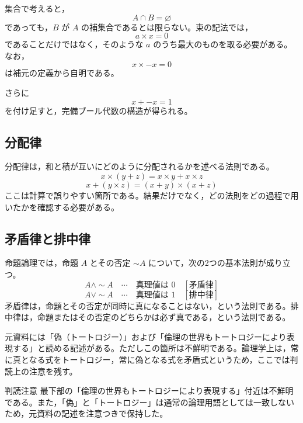 \documentclass[../main.tex]{subfiles}
\begin{document}
\begin{center}
\end{center}

集合で考えると，
\[
  A \cap B = \varnothing
\]
であっても，\(B\) が \(A\) の補集合であるとは限らない。束の記法では，
\[
  a \times x = 0
\]
であることだけではなく，そのような \(a\) のうち最大のものを取る必要がある。なお，
\[
  x \times -x = 0
\]
は補元の定義から自明である。

さらに
\[
  x + -x = 1
\]
を付け足すと，完備ブール代数の構造が得られる。

\subsection{分配律}

分配律は，和と積が互いにどのように分配されるかを述べる法則である。
\[
  x \times (y+z)
  =
  x \times y + x \times z
\]
\[
  x + (y \times z)
  =
  (x+y) \times (x+z)
\]
ここは計算で誤りやすい箇所である。結果だけでなく，どの法則をどの過程で用いたかを確認する必要がある。

\subsection{矛盾律と排中律}

命題論理では，命題 \(A\) とその否定 \(\sim A\) について，次の2つの基本法則が成り立つ。
\[
  A \land \sim A
  \quad
  \cdots
  \quad
  \text{真理値は }0
  \quad
  [\text{矛盾律}]
\]
\[
  A \lor \sim A
  \quad
  \cdots
  \quad
  \text{真理値は }1
  \quad
  [\text{排中律}]
\]
矛盾律は，命題とその否定が同時に真になることはない，という法則である。排中律は，命題またはその否定のどちらかは必ず真である，という法則である。

元資料には「偽（トートロジー）」および「倫理の世界もトートロジーにより表現する」と読める記述がある。ただしこの箇所は不鮮明である。論理学上は，常に真となる式をトートロジー，常に偽となる式を矛盾式というため，ここでは判読上の注意を残す。

\begin{sidebox}[TBred]{判読注意}
  最下部の「倫理の世界もトートロジーにより表現する」付近は不鮮明である。また，「偽」と「トートロジー」は通常の論理用語としては一致しないため，元資料の記述を注意つきで保持した。
\end{sidebox}
\end{document}
